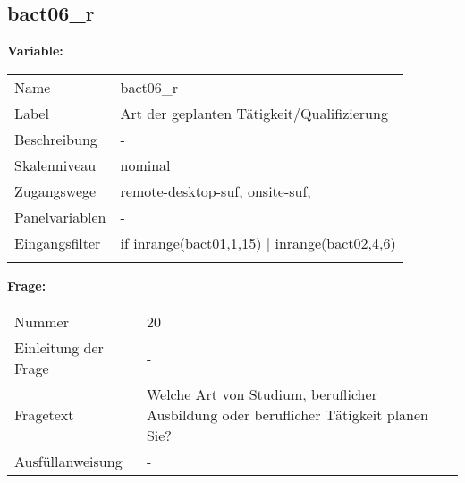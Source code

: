 	
	
	\subsection{bact06\_r}
	\label{subSection:bact06_r}

	\noindent\textbf{Variable:}\\
		\begin{tabular}{lL{11.3cm}}
			\label{tableVariable:bact06_r}
			Name & bact06\_r \\
			Label & Art der geplanten Tätigkeit/Qualifizierung \\
			Beschreibung & - \\
			Skalenniveau & nominal \\
			Zugangswege &
				remote-desktop-suf,
				onsite-suf,
 \\
			Panelvariablen & -
			 \\
			Eingangsfilter & if inrange(bact01,1,15) | inrange(bact02,4,6) \\
 \\
		\end{tabular}

		\vspace*{1 cm}
		\noindent\textbf{Frage:}\\
		\begin{tabular}{lL{11.3cm}}
			\label{tableQuestion:bact06_r}
			Nummer & 20 \\
			Einleitung der Frage & - \\
			Fragetext & Welche Art von Studium, beruflicher Ausbildung oder beruflicher Tätigkeit planen Sie? \\
			Ausfüllanweisung & - \\
		\end{tabular}





